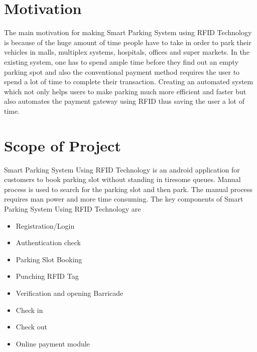 \documentclass[12pt,a4paper]{report}
\begin{document}
\section{Motivation}
The  main   motivation  for   making  Smart Parking System using RFID Technology is because  of  the  huge  amount  of  time  people  have  to  take  in order to park their vehicles in malls, multiplex systems, hospitals, offices  and  super  markets.  In  the  existing system, one  has  to spend ample  time  before  they find out an empty parking spot and also the conventional payment method requires the user to spend  a  lot  of  time  to  complete  their  transaction.  Creating  an automated system which not only helps users to make parking much  more   efficient   and   faster   but   also   automates   the payment  gateway  using  RFID  thus  saving  the  user  a  lot  of 	time.
\section{Scope of Project}
Smart Parking System Using RFID Technology is an android application for customers to book parking slot without standing in tiresome queues. Manual process is used to search for the parking slot and then park. The manual process requires man power and more time consuming. The key components of Smart Parking System Using RFID Technology are
\begin{itemize}
	\item Registration/Login
	\item Authentication check
	\item Parking Slot Booking
	\item Punching RFID Tag
	\item Verification and opening Barricade
	\item Check in 
	\item Check out
	\item Online payment module
\end{itemize}\newpage
\end{document}

